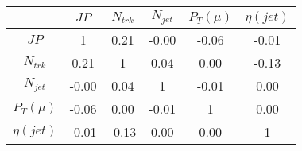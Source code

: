 \begin{tabular}{|c|c|c|c|c|c|} 
\hline
 & $JP$ & $N_{trk}$ & $N_{jet}$ & $P_{T} (\mu)$ & $\eta (jet)$ \\ \hline
$JP$ & 1 & 0.21 & -0.00 & -0.06 & -0.01 \\
$N_{trk}$ & 0.21 & 1 & 0.04 & 0.00 & -0.13 \\
$N_{jet}$ & -0.00 & 0.04 & 1 & -0.01 & 0.00 \\
$P_{T} (\mu)$ & -0.06 & 0.00 & -0.01 & 1 & 0.00 \\
$\eta (jet)$ & -0.01 & -0.13 & 0.00 & 0.00 & 1 \\
\hline 
\end{tabular} 


